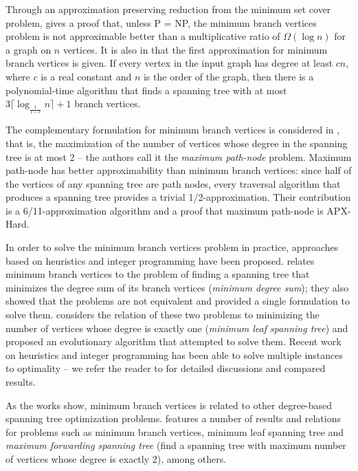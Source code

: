\documentclass[12pt]{article}
\begin{document}
Through an approximation preserving reduction from the minimum set cover problem, \cite{salamon2010} gives a proof that, unless P = NP, the minimum branch vertices problem is not approximable better than a multiplicative ratio of $\Omega(\log n)$ for a graph on $n$ vertices.
It is also in \cite{salamon2010} that the first approximation for minimum branch vertices is given.
If every vertex in the input graph has degree at least $cn$, where $c$ is a real constant and $n$ is the order of the graph, then there is a polynomial-time algorithm that finds a spanning tree with at most $3\lceil \log_{\frac{1}{1 - c}}n\rceil + 1$ branch vertices. 

The complementary formulation for minimum branch vertices is considered in \cite{chimani2015}, that is, the maximization of the number of vertices whose degree in the spanning tree is at most 2 -- the authors call it the \emph{maximum path-node} problem.
Maximum path-node has better approximability than minimum branch vertices: since half of the vertices of any spanning tree are path nodes, every traversal algorithm that produces a spanning tree provides a trivial 1/2-approximation.
Their contribution is a 6/11-approximation algorithm and a proof that maximum path-node is APX-Hard.

In order to solve the minimum branch vertices problem in practice, approaches based on heuristics and integer programming have been proposed.
\cite{cerulli2009} relates minimum branch vertices to the problem of finding a spanning tree that minimizes the degree sum of its branch vertices (\emph{minimum degree sum}); they also showed that the problems are not equivalent and provided a single formulation to solve them.
\cite{cerrone2014} considers the relation of these two problems to minimizing the number of vertices whose degree is exactly one (\emph{minimum leaf spanning tree}) and proposed an evolutionary algorithm that attempted to solve them.
Recent work on heuristics and integer programming has been able to solve multiple instances to optimality -- we refer the reader to \cite{marin2015, melo2016, silvestri2017} for detailed discussions and compared results.

As the works \cite{cerulli2009, cerrone2014} show, minimum branch vertices is related to other degree-based spanning tree optimization problems.
\cite{salamon2010} features a number of results and relations for problems such as minimum branch vertices, minimum leaf spanning tree and \emph{maximum forwarding spanning tree} (find a spanning tree with maximum number of vertices whose degree is exactly 2), among others.
\end{document}
